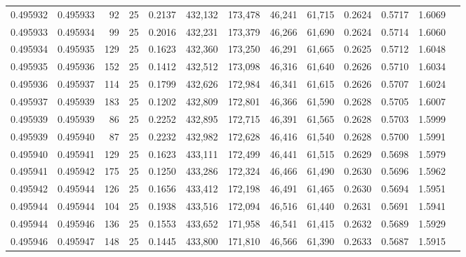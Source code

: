 \begin{tabular}{rrrrrrrrrrrrr}
0.495932 & 0.495933 &    92 &  25 &                                     0.2137 & 432,132 & 173,478 &  46,241 &  61,715 & 0.2624 & 0.5717 & 1.6069 \\
0.495933 & 0.495934 &    99 &  25 &                                     0.2016 & 432,231 & 173,379 &  46,266 &  61,690 & 0.2624 & 0.5714 & 1.6060 \\
0.495934 & 0.495935 &   129 &  25 &                                     0.1623 & 432,360 & 173,250 &  46,291 &  61,665 & 0.2625 & 0.5712 & 1.6048 \\
0.495935 & 0.495936 &   152 &  25 &                                     0.1412 & 432,512 & 173,098 &  46,316 &  61,640 & 0.2626 & 0.5710 & 1.6034 \\
0.495936 & 0.495937 &   114 &  25 &                                     0.1799 & 432,626 & 172,984 &  46,341 &  61,615 & 0.2626 & 0.5707 & 1.6024 \\
0.495937 & 0.495939 &   183 &  25 &                                     0.1202 & 432,809 & 172,801 &  46,366 &  61,590 & 0.2628 & 0.5705 & 1.6007 \\
0.495939 & 0.495939 &    86 &  25 &                                     0.2252 & 432,895 & 172,715 &  46,391 &  61,565 & 0.2628 & 0.5703 & 1.5999 \\
0.495939 & 0.495940 &    87 &  25 &                                     0.2232 & 432,982 & 172,628 &  46,416 &  61,540 & 0.2628 & 0.5700 & 1.5991 \\
0.495940 & 0.495941 &   129 &  25 &                                     0.1623 & 433,111 & 172,499 &  46,441 &  61,515 & 0.2629 & 0.5698 & 1.5979 \\
0.495941 & 0.495942 &   175 &  25 &                                     0.1250 & 433,286 & 172,324 &  46,466 &  61,490 & 0.2630 & 0.5696 & 1.5962 \\
0.495942 & 0.495944 &   126 &  25 &                                     0.1656 & 433,412 & 172,198 &  46,491 &  61,465 & 0.2630 & 0.5694 & 1.5951 \\
0.495944 & 0.495944 &   104 &  25 &                                     0.1938 & 433,516 & 172,094 &  46,516 &  61,440 & 0.2631 & 0.5691 & 1.5941 \\
0.495944 & 0.495946 &   136 &  25 &                                     0.1553 & 433,652 & 171,958 &  46,541 &  61,415 & 0.2632 & 0.5689 & 1.5929 \\
0.495946 & 0.495947 &   148 &  25 &                                     0.1445 & 433,800 & 171,810 &  46,566 &  61,390 & 0.2633 & 0.5687 & 1.5915 \\

\end{tabular}
